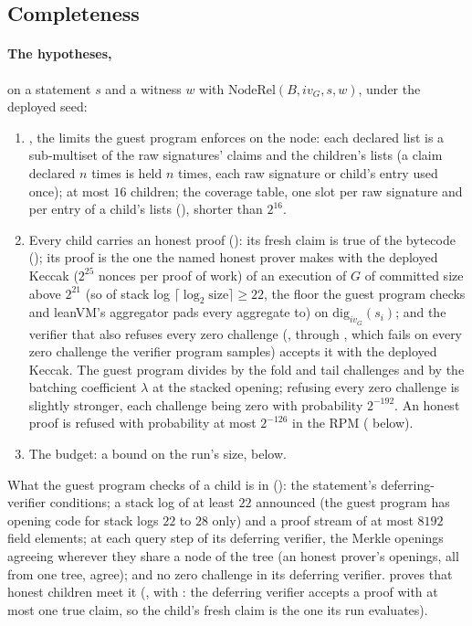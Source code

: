 \documentclass[11pt]{article}
\begin{document}
\subsection{Completeness}

\paragraph{The hypotheses,} on a statement $s$ and a witness $w$ with
$\mathrm{NodeRel}(B, iv_G, s, w)$, under the deployed seed:
\begin{enumerate}
\item {}, the limits the guest program enforces on the node: each declared list
is a sub-multiset of the raw signatures' claims and the children's lists (a claim declared $n$ times
is held $n$ times, each raw signature or child's entry used once); at most $16$ children; the
coverage table, one slot per raw signature and per entry of a child's lists
(), shorter than $2^{16}$.
\item Every child carries an honest proof (): its fresh claim is true of the
bytecode (); its proof is the one the named honest prover
 makes with the deployed Keccak
($2^{25}$ nonces per proof of work) of an execution of $G$ of
committed size above $2^{21}$ (so of stack log $\lceil\log_2 \mathrm{size}\rceil \ge 22$, the floor
the guest program checks and leanVM's aggregator pads every aggregate to) on
$\mathrm{dig}_{iv_G}(s_i)$; and the verifier that also refuses
every zero challenge (, through
, which fails on every zero challenge the verifier
program samples) accepts it with the deployed Keccak. The guest program divides by the fold and tail
challenges and by the batching coefficient $\lambda$ at the stacked opening; refusing every zero
challenge is slightly stronger, each challenge being zero with probability $2^{-192}$. An honest
proof is refused with probability at most $2^{-126}$ in the RPM (
below).
\item The budget: a bound on the run's size, below.
\end{enumerate}
What the guest program checks of a child is in  (): the
statement's deferring-verifier conditions; a stack log of at least $22$ announced (the guest program
has opening code for stack logs $22$ to $28$ only) and a proof stream of at most $8192$ field
elements; at each query step of its deferring verifier, the Merkle openings agreeing wherever they
share a node of the tree (an honest prover's openings, all from one tree, agree); and no zero
challenge in its deferring verifier.  proves that honest children meet it
(, with : the deferring verifier accepts a proof
with at most one true claim, so the child's fresh claim is the one its run evaluates).
\end{document}
